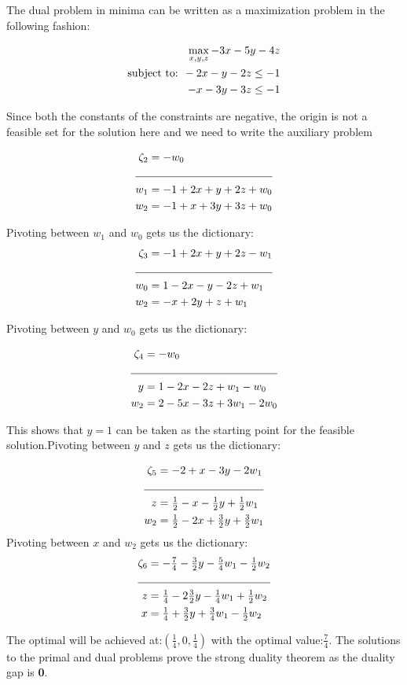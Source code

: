 \documentclass[letterpaper,12pt]{article}
\theoremstyle{definition}
\begin{document}
\vspace{3mm}
\begin{flushleft}
The dual problem in minima can be written as a maximization problem in the following fashion:
\end{flushleft}

\begin{align*}
  \max_{{x,y,z}} -3x-5y-4z\\
  \textnormal{subject to: } -2x-y-2z\leq -1\\
   -x-3y-3z\leq -1\\
\end{align*}

Since both the constants of the constraints are negative, the origin is not a feasible set for the solution here and we need to write the auxiliary problem

\begin{align*}
\zeta_2 & =-w_0\\
\cline{1-2}
w_1 &=-1+2x+y+2z+w_0\\
w_2 &=-1+x+3y+3z+w_0\\
\end{align*}

Pivoting between $w_1$ and $w_0$ gets us the dictionary:
\begin{align*}
\zeta_3 &=-1+2x+y+2z-w_1\\
\cline{1-2}
w_0 &=1-2x-y-2z+w_1\\
w_2 &=-x+2y+z+w_1\\
\end{align*}

Pivoting between $y$ and $w_0$ gets us the dictionary:

\begin{align*}
\zeta_4 & =-w_0\\
\cline{1-2}
y & =1-2x-2z+w_1-w_0\\
w_2 & =2-5x-3z+3w_1-2w_0\\
\end{align*}
\begin{flushleft}
This shows that $y=1$ can be taken as the starting point for the feasible solution.Pivoting between $y$ and $z$ gets us the dictionary:
\end{flushleft}

\begin{align*}
\zeta_5 & =-2+x-3y-2w_1\\
\cline{1-2}
z &=\tfrac{1}{2}-x-\tfrac{1}{2}y+\tfrac{1}{2}w_1\\
w_2 &=\tfrac{1}{2}-2x+\tfrac{3}{2}y+\tfrac{3}{2}w_1\\
\end{align*}
Pivoting between $x$ and $w_2$ gets us the dictionary:  
\begin{align*}
\zeta_6 &=-\tfrac{7}{4}-\tfrac{3}{2}y-\tfrac{5}{4}w_1-\tfrac{1}{2}w_2\\
\cline{1-2}
z &=\tfrac{1}{4}-2\tfrac{3}{2}y-\tfrac{1}{4}w_1+\tfrac{1}{2}w_2\\
x &=\tfrac{1}{4}+\tfrac{3}{2}y+\tfrac{3}{4}w_1-\tfrac{1}{2}w_2\\    
\end{align*}

\begin{flushleft}
The optimal will be achieved at:$(\frac{1}{4},0,\frac{1}{4})$ with the optimal value:$\frac{7}{4}$. The solutions to the primal and dual problems prove the strong duality theorem as the duality gap is \textbf{0}.
\end{flushleft}
 
\end{document}
